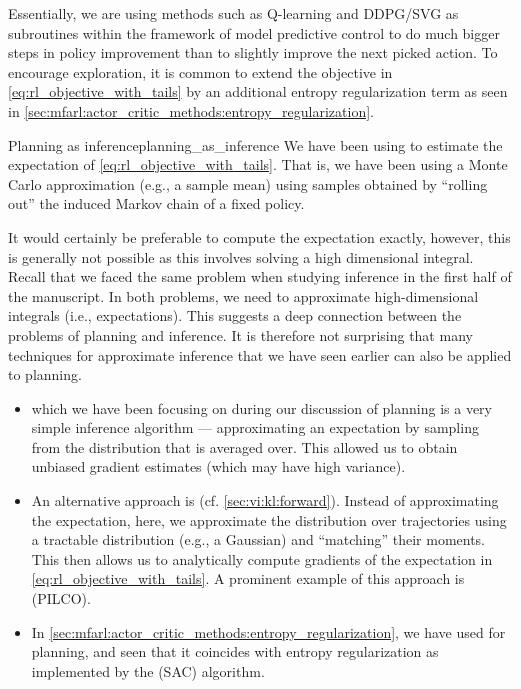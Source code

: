 Essentially, we are using methods such as Q-learning and DDPG/SVG as subroutines within the framework of model predictive control to do much bigger steps in policy improvement than to slightly improve the next picked action.
To encourage exploration, it is common to extend the objective in \cref{eq:rl_objective_with_tails} by an additional entropy regularization term as seen in \cref{sec:mfarl:actor_critic_methods:entropy_regularization}.

\begin{rmk}{Planning as inference}{planning_as_inference}
  We have been using  to estimate the expectation of \cref{eq:rl_objective_with_tails}.
  That is, we have been using a Monte Carlo approximation (e.g., a sample mean) using samples obtained by ``rolling out'' the induced Markov chain of a fixed policy.

  It would certainly be preferable to compute the expectation exactly, however, this is generally not possible as this involves solving a high dimensional integral.
  Recall that we faced the same problem when studying inference in the first half of the manuscript.
  In both problems, we need to approximate high-dimensional integrals (i.e., expectations).
  This suggests a deep connection between the problems of planning and inference.
  It is therefore not surprising that many techniques for approximate inference that we have seen earlier can also be applied to planning.

  \begin{itemize}
    \item {} which we have been focusing on during our discussion of planning is a very simple inference algorithm --- approximating an expectation by sampling from the distribution that is averaged over.
    This allowed us to obtain unbiased gradient estimates (which may have high variance).

    \item An alternative approach is  (cf. \cref{sec:vi:kl:forward}).
    Instead of approximating the expectation, here, we approximate the distribution over trajectories using a tractable distribution (e.g., a Gaussian) and ``matching'' their moments.
    This then allows us to analytically compute gradients of the expectation in \cref{eq:rl_objective_with_tails}.
    A prominent example of this approach is  (PILCO).

    \item In \cref{sec:mfarl:actor_critic_methods:entropy_regularization}, we have used  for planning, and seen that it coincides with entropy regularization as implemented by the  (SAC) algorithm.
  \end{itemize}
\end{rmk}

